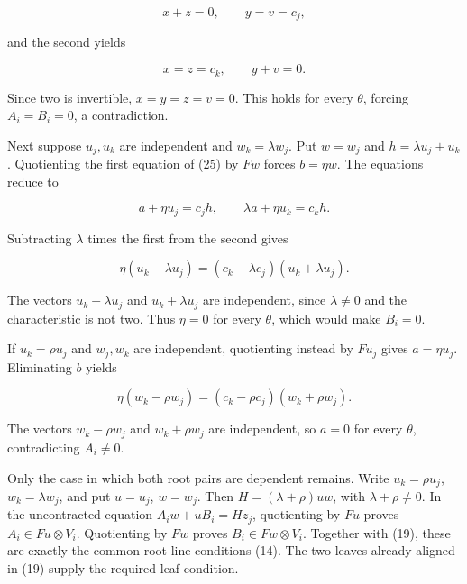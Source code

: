 \documentclass[11pt]{article}
\begin{document}
\nopagebreak[4]

\begin{equation}
x+z=0,\qquad y=v=c_j,
\tag{26}
\end{equation}

and the second yields


\nopagebreak[4]

\begin{equation}
x=z=c_k,\qquad y+v=0.
\tag{27}
\end{equation}

Since two is invertible, $x=y=z=v=0$. This holds for every $\theta$, forcing $A_i=B_i=0$, a contradiction.


Next suppose $u_j,u_k$ are independent and $w_k=\lambda w_j$. Put $w=w_j$ and $h=\lambda u_j+u_k$. Quotienting the first equation of (25) by $F w$ forces $b=\eta w$. The equations reduce to


\nopagebreak[4]

\begin{equation}
a+\eta u_j=c_jh,\qquad \lambda a+\eta u_k=c_kh.
\tag{28}
\end{equation}

Subtracting $\lambda$ times the first from the second gives


\nopagebreak[4]

\begin{equation}
\eta(u_k-\lambda u_j)=(c_k-\lambda c_j)(u_k+\lambda u_j).
\tag{29}
\end{equation}

The vectors $u_k-\lambda u_j$ and $u_k+\lambda u_j$ are independent, since $\lambda\ne0$ and the characteristic is not two. Thus $\eta=0$ for every $\theta$, which would make $B_i=0$.


If $u_k=\rho u_j$ and $w_j,w_k$ are independent, quotienting instead by $F u_j$ gives $a=\eta u_j$. Eliminating $b$ yields


\nopagebreak[4]

\begin{equation}
\eta(w_k-\rho w_j)=(c_k-\rho c_j)(w_k+\rho w_j).
\tag{30}
\end{equation}

The vectors $w_k-\rho w_j$ and $w_k+\rho w_j$ are independent, so $a=0$ for every $\theta$, contradicting $A_i\ne0$.


Only the case in which both root pairs are dependent remains. Write $u_k=\rho u_j$, $w_k=\lambda w_j$, and put $u=u_j$, $w=w_j$. Then $H=(\lambda+\rho)uw$, with $\lambda+\rho\ne0$. In the uncontracted equation $A_iw+uB_i=Hz_j$, quotienting by $F u$ proves $A_i\in F u\otimes V_i$. Quotienting by $F w$ proves $B_i\in F w\otimes V_i$. Together with (19), these are exactly the common root-line conditions (14). The two leaves already aligned in (19) supply the required leaf condition.
\end{document}
